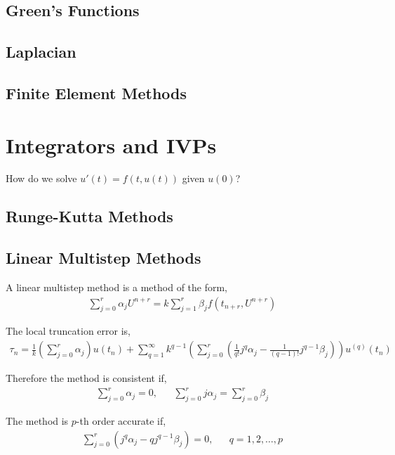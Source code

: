 \documentclass[12pt]{article}
\begin{document}
\subsection{Green's Functions}

\subsection{Laplacian}

\subsection{Finite Element Methods}

\pagebreak
\section{Integrators and IVPs}
How do we solve \( u'(t) = f(t,u(t)) \) given \( u(0) \)?

\subsection{Runge-Kutta Methods}


\subsection{Linear Multistep Methods}
A linear multistep method is a method of the form,
\begin{align*}
    \sum_{j=0}^{r} \alpha_j U^{n+r} = k \sum_{j=1}^{r} \beta_j f(t_{n+r},U^{n+r})
\end{align*}

The local truncation error is,
\begin{align*}
    \tau_n = \frac{1}{k} \left( \sum_{j=0}^{r} \alpha_j \right) u(t_n) + \sum_{q=1}^{\infty} k^{q-1} \left( \sum_{j=0}^{r} \left( \frac{1}{q!}j^q \alpha_j - \frac{1}{(q-1)!}j^{q-1}\beta_j \right)\right) u^{(q)}(t_n)
\end{align*}

Therefore the method is consistent if,
\begin{align*}
    \sum_{j=0}^{r}\alpha_j = 0, && \sum_{j=0}^{r} j \alpha_j = \sum_{j=0}^{r} \beta_j
\end{align*}

The method is \( p \)-th order accurate if,
\begin{align*}
    \sum_{j=0}^{r} \left( j^{q} \alpha_j - q j^{q-1}\beta_j \right) = 0, && q=1,2,\ldots, p 
\end{align*}
\end{document}

